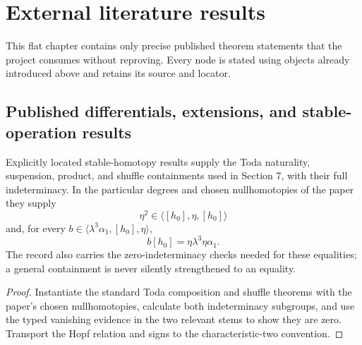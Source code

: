 \chapter{External literature results}
\label{chap:external-results}

This flat chapter contains only precise published theorem statements that the project consumes without reproving.  Every node is stated using objects already introduced above and retains its source and locator.

\section{Published differentials, extensions, and stable-operation results}

\begin{theorem}
  \label{thm:toda-product-identities}
  \notready
  Explicitly located stable-homotopy results supply the Toda naturality,
  suspension, product, and shuffle containments used in Section 7, with their
  full indeterminacy.  In the particular degrees and chosen nullhomotopies of
  the paper they supply
  \[
    \eta^2\in\langle[h_0],\eta,[h_0]\rangle
  \]
  and, for every
  $b\in\langle\lambda^3\alpha_1,[h_0],\eta\rangle$,
  \[
    b[h_0]=\eta\lambda^3\eta\alpha_1.
  \]
  The record also carries the zero-indeterminacy checks needed for these
  equalities; a general containment is never silently strengthened to an
  equality.
\end{theorem}

\begin{proof}
  Instantiate the standard Toda composition and shuffle theorems with the
  paper's chosen nullhomotopies, calculate both indeterminacy subgroups, and
  use the typed vanishing evidence in the two relevant stems to show they are
  zero.  Transport the Hopf relation and signs to the characteristic-two
  convention.
\end{proof}

